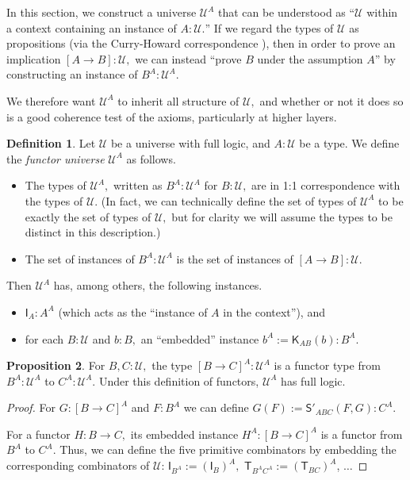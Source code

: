 \documentclass[a4paper]{article}
\theoremstyle{definition}
\newtheorem{definition}{Definition}[section]
\newtheorem{proposition}[definition]{Proposition}
\theoremstyle{remark}
\newcommand{\defn}{\emph}
\newcommand{\U}{\mathcal{U}}
\newcommand{\nm}{\mathsf}
\newcommand{\combinator}{\nm}
\newcommand{\idFun}{\combinator{I}}
\newcommand{\revAppFun}{\combinator{T}}
\newcommand{\constFun}{\combinator{K}}
\newcommand{\substFun}{\combinator{S'}}
\begin{document}
In this section, we construct a universe $\U^A$ that can be understood as ``$\U$ within a context
containing an instance of $A : \U.$'' If we regard the types of $\U$ as propositions (via the
Curry-Howard correspondence \cite{curry-howard}), then in order to prove an implication
$[A \to B] : \U,$ we can instead ``prove $B$ under the assumption $A$'' by constructing an instance
of $B^A : \U^A.$

We therefore want $\U^A$ to inherit all structure of $\U,$ and whether or not it does so is a good
coherence test of the axioms, particularly at higher layers.

\begin{definition}
  Let $\U$ be a universe with full logic, and $A : \U$ be a type. We define the
  \defn{functor universe} $\U^A$ as follows.
  \begin{itemize}
    \item The types of $\U^A,$ written as $B^A : \U^A$ for $B : \U,$ are in 1:1 correspondence with
    the types of $\U.$ (In fact, we can technically define the set of types of $\U^A$ to be exactly
    the set of types of $\U,$ but for clarity we will assume the types to be distinct in this
    description.)
    \item The set of instances of $B^A : \U^A$ is the set of instances of $[A \to B] : \U.$
  \end{itemize}
\end{definition}

Then $\U^A$ has, among others, the following instances.
\begin{itemize}
  \item $\idFun_A : A^A$ (which acts as the ``instance of $A$ in the context''), and
  \item for each $B : \U$ and $b : B,$ an ``embedded'' instance $b^A := \constFun_{AB}(b) : B^A.$
\end{itemize}

\begin{proposition}
  For $B,C : \U,$ the type $[B \to C]^A : \U^A$ is a functor type from $B^A : \U^A$ to $C^A : \U^A.$
  Under this definition of functors, $\U^A$ has full logic.
\end{proposition}
\vspace{-1ex}
\begin{proof}
  For $G : [B \to C]^A$ and $F : B^A$ we can define $G(F) := \substFun_{ABC}(F,G) : C^A.$

  For a functor $H : B \to C,$ its embedded instance $H^A : [B \to C]^A$ is a functor from $B^A$ to
  $C^A.$ Thus, we can define the five primitive combinators by embedding the corresponding
  combinators of $\U$:
  $\idFun_{B^A} := (\idFun_B)^A,$ $\revAppFun_{B^A C^A} := (\revAppFun_{BC})^A$, $\ldots$
\end{proof}
\end{document}
